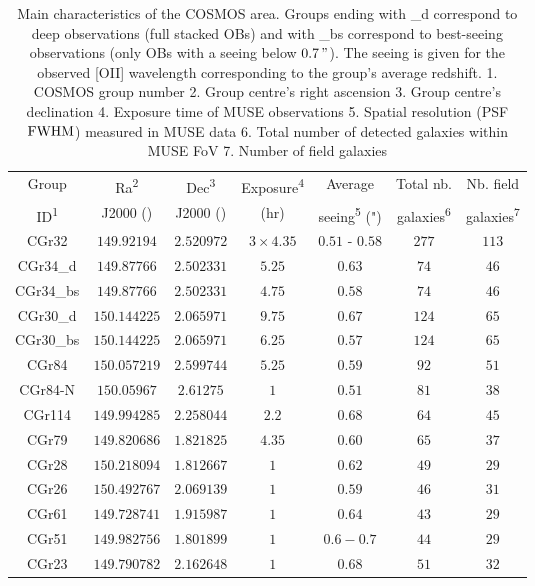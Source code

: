 \begin{table}[htbp]

	\hspace{50pt}

	\begin{tabular}{ccccccc}
	\hline
	Group & Ra\textsuperscript{2} & Dec\textsuperscript{3} & Exposure\textsuperscript{4}  & Average & Total nb. & Nb. field \\
	
	ID\textsuperscript{1} & J2000 (\degree) & J2000 (\degree) & (hr) & seeing\textsuperscript{5} (") & galaxies\textsuperscript{6} & galaxies\textsuperscript{7} \\	
	
	
	\hline
	CGr32 & $149.92194$ & $2.520972$ & $3 \times 4.35$ & $0.51$ - $0.58$ & $277$ & $113$ \\
	\hline
	CGr34\_d & $149.87766$ & $2.502331$ & $5.25$ & $0.63$ & $74$ & $46$ \\
	\hline
	CGr34\_bs & $149.87766$ & $2.502331$ & $4.75$ & $0.58$ & $74$ & $46$ \\
	\hline
	CGr30\_d & $150.144225$ & $2.065971$ & $9.75$ & $0.67$ & $124$ & $65$ \\
	\hline
	CGr30\_bs & $150.144225$ & $2.065971$ & $6.25$ & $0.57$ & $124$ & $65$ \\
	\hline
	CGr84 & $150.057219$ & $2.599744$ & $5.25$ & $0.59$ & $92$ & $51$ \\
	\hline
	CGr84-N & $150.05967$ & $2.61275$ & $1$ & $0.51$ & $81$ & $38$ \\
	\hline
	CGr114 & $149.994285$ & $2.258044$ & $2.2$ & $0.68$ & $64$ & $45$ \\
	\hline
	CGr79 & $149.820686$ & $1.821825$ & $4.35$ & $0.60$ & $65$ & $37$ \\
	\hline
	CGr28 & $150.218094$ & $1.812667$ & $1$ & $0.62$ & $49$ & $29$ \\
	\hline
	CGr26 & $150.492767$ & $2.069139$ & $1$ & $0.59$ & $46$ & $31$ \\
	\hline
	CGr61 & $149.728741$ & $1.915987$ & $1$ & $0.64$ & $43$ & $29$ \\
	\hline
	CGr51 & $149.982756$ & $1.801899$ & $1$ & $0.6-0.7$ & $44$ & $29$ \\
	\hline
	CGr23 & $149.790782$ & $2.162648$ & $1$ & $0.68$ & $51$ & $32$ \\
	\hline
	
	\end{tabular}
	
	\caption[Main characteristics of the COSMOS area.]{Main characteristics of the COSMOS area. Groups ending with \_d correspond to deep observations (full stacked OBs) and with \_bs correspond to best-seeing observations (only OBs with a seeing below $\SI{0.7}{"}$). The seeing is given for the observed [OII] wavelength corresponding to the group's average redshift. 1. COSMOS group number 2. Group centre's right ascension 3. Group centre's declination 4. Exposure time of MUSE observations 5. Spatial resolution (PSF $\rm{FWHM}$) measured in MUSE data 6. Total number of detected galaxies within MUSE FoV 7. Number of field galaxies}
	\label{table:MUSEfieldsProp}
\end{table}


